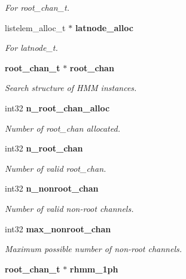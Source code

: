 \begin{DoxyCompactItemize}
\begin{DoxyCompactList}\small\item\em For root\+\_\+chan\+\_\+t. \end{DoxyCompactList}\item 
listelem\+\_\+alloc\+\_\+t $\ast$ {\bf latnode\+\_\+alloc}\label{structngram__search__s_a21600dc2e23744f0be9c64a4db8d7e50}

\begin{DoxyCompactList}\small\item\em For latnode\+\_\+t. \end{DoxyCompactList}\item 
{\bf root\+\_\+chan\+\_\+t} $\ast$ {\bf root\+\_\+chan}
\begin{DoxyCompactList}\small\item\em Search structure of H\+M\+M instances. \end{DoxyCompactList}\item 
int32 {\bf n\+\_\+root\+\_\+chan\+\_\+alloc}\label{structngram__search__s_abc8a67e3f64adc470c78dfdd23be4126}

\begin{DoxyCompactList}\small\item\em Number of root\+\_\+chan allocated. \end{DoxyCompactList}\item 
int32 {\bf n\+\_\+root\+\_\+chan}\label{structngram__search__s_a297d8bdb856617490ee8ccd99df70e68}

\begin{DoxyCompactList}\small\item\em Number of valid root\+\_\+chan. \end{DoxyCompactList}\item 
int32 {\bf n\+\_\+nonroot\+\_\+chan}\label{structngram__search__s_a043723786367f5026dce99c261f7086d}

\begin{DoxyCompactList}\small\item\em Number of valid non-\/root channels. \end{DoxyCompactList}\item 
int32 {\bf max\+\_\+nonroot\+\_\+chan}\label{structngram__search__s_a4b2b42349e9e3df7e93b4a7d6994f63f}

\begin{DoxyCompactList}\small\item\em Maximum possible number of non-\/root channels. \end{DoxyCompactList}\item 
{\bf root\+\_\+chan\+\_\+t} $\ast$ {\bf rhmm\+\_\+1ph}\label{structngram__search__s_a1ffa3c9100252122ae8a2a713c50b527}


\end{DoxyCompactItemize}
